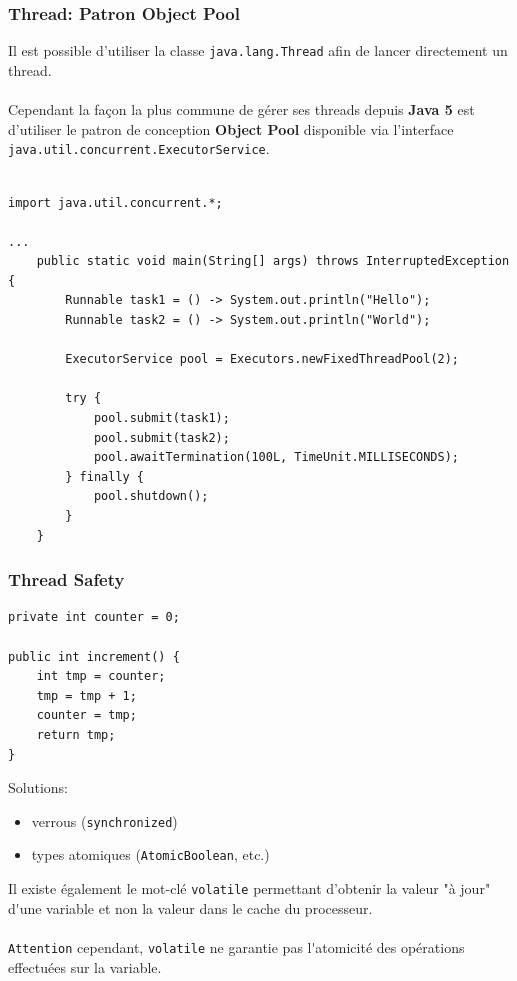 \begin{frame}[fragile]
	\frametitle{Thread: Patron Object Pool}
    Il est possible d'utiliser la classe {\lstinline[basicstyle=\ttfamily\color{blue}]|java.lang.Thread|} afin de lancer directement un thread.
    \\~\\
    Cependant la fa\c{c}on la plus commune de g\'{e}rer ses threads depuis \textbf{Java 5} est d'utiliser le patron de conception \textbf{Object Pool} disponible via l'interface {\lstinline[basicstyle=\ttfamily\color{blue}]|java.util.concurrent.ExecutorService|}.
    \\~
    \begin{lstlisting}[basicstyle=\tiny]
import java.util.concurrent.*;

...
	public static void main(String[] args) throws InterruptedException {
		Runnable task1 = () -> System.out.println("Hello");
		Runnable task2 = () -> System.out.println("World");

		ExecutorService pool = Executors.newFixedThreadPool(2);

		try {
			pool.submit(task1);
			pool.submit(task2);
			pool.awaitTermination(100L, TimeUnit.MILLISECONDS);
		} finally {
			pool.shutdown();
		}
	}
	\end{lstlisting}
\end{frame}

\begin{frame}[fragile]
	\frametitle{Thread Safety}
    \begin{lstlisting}
private int counter = 0;

public int increment() {
    int tmp = counter;
    tmp = tmp + 1;
    counter = tmp;
    return tmp;
}
	\end{lstlisting}
    Solutions:
    \begin{itemize}
    	\item verrous ({\lstinline[basicstyle=\ttfamily\color{blue}]|synchronized|})
        \item types atomiques ({\lstinline[basicstyle=\ttfamily\color{blue}\small]|AtomicBoolean|}, etc.)
    \end{itemize}
    
    Il existe \'{e}galement le mot-cl\'{e} {\lstinline[basicstyle=\ttfamily\color{blue}]|volatile|} permettant d'obtenir la valeur "\`{a} jour" d\'{}une variable et non la valeur dans le cache du processeur.
    \\~\\
    {\lstinline[basicstyle=\color{red}]|Attention|} cependant, {\lstinline[basicstyle=\ttfamily\color{blue}]|volatile|} ne garantie pas l\'{}atomicit\'{e} des op\'{e}rations effectu\'{e}es sur la variable.
\end{frame}

